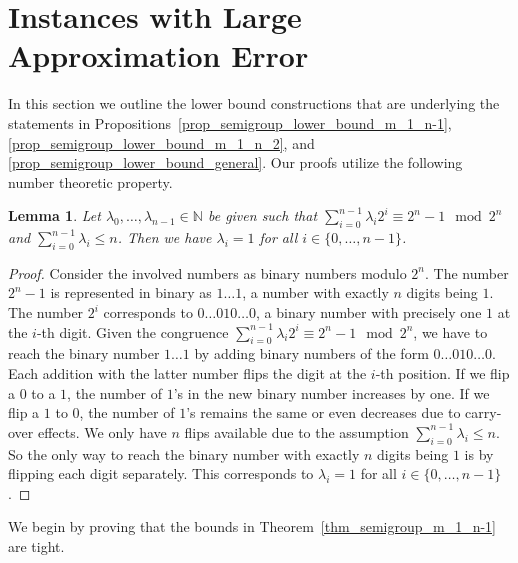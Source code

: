 \documentclass[pdflatex]{sn-jnl}
\newcommand{\N}{\mathbb{N}}
\theoremstyle{thmstyleone}%
\newtheorem{lemma}{Lemma}
\theoremstyle{thmstyletwo}%
\theoremstyle{thmstylethree}%
\begin{document}
	\section{Instances with Large Approximation Error}
	\label{s_semigroups_lower_bounds}
	In this section we outline the lower bound constructions that are underlying the statements in Propositions~\ref{prop_semigroup_lower_bound_m_1_n-1}, \ref{prop_semigroup_lower_bound_m_1_n_2}, and \ref{prop_semigroup_lower_bound_general}. 
	Our proofs utilize the following number theoretic property.
	\begin{lemma}
		\label{lemma_semigroup_lower_bound}
		Let $\lambda_0,\ldots,\lambda_{n-1}\in\N$ be given such that $\sum_{i=0}^{n-1}\lambda_i2^i \equiv 2^n - 1 \mod 2^n$ and $\sum_{i=0}^{n-1}\lambda_i \leq n$. Then we have $\lambda_i = 1$ for all $i\in\lbrace 0,\ldots,n-1\rbrace$.
	\end{lemma}
	\begin{proof}
		Consider the involved numbers as binary numbers modulo $2^n$. The number $2^n-1$ is represented in binary as $1\ldots1$, a number with exactly $n$ digits being $1$. The number $2^i$ corresponds to $0\ldots010\ldots0$, a binary number with precisely one $1$ at the $i$-th digit. Given the congruence $\sum_{i=0}^{n-1}\lambda_i2^i \equiv 2^n - 1 \mod 2^n$, we have to reach the binary number $1\ldots1$ by adding binary numbers of the form $0\ldots010\ldots0$. Each addition with the latter number flips the digit at the $i$-th position. If we flip a $0$ to a $1$, the number of $1$'s in the new binary number increases by one. If we flip a $1$ to $0$, the number of $1$'s remains the same or even decreases due to carry-over effects. We only have $n$ flips available due to the assumption $\sum_{i=0}^{n-1}\lambda_i \leq n$. So the only way to reach the binary number with exactly $n$ digits being $1$ is by flipping each digit separately. This corresponds to $\lambda_i = 1$ for all $i\in\lbrace 0,\ldots,n-1\rbrace$.
	\end{proof}
	We begin by proving that the bounds in Theorem~\ref{thm_semigroup_m_1_n-1} are tight. 
\end{document}
